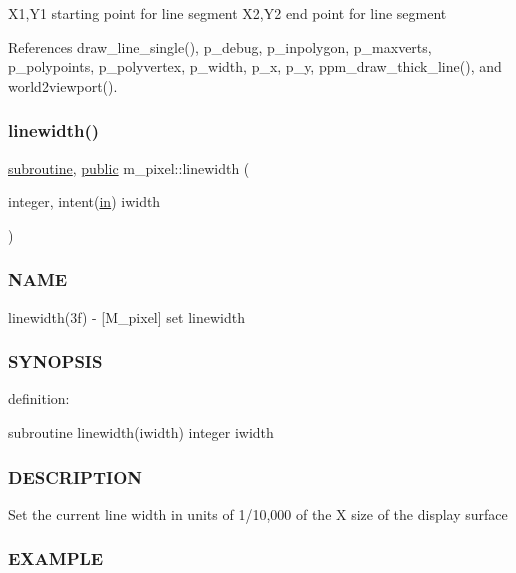 X1,Y1 starting point for line segment X2,Y2 end point for line segment 

References draw\+\_\+line\+\_\+single(), p\+\_\+debug, p\+\_\+inpolygon, p\+\_\+maxverts, p\+\_\+polypoints, p\+\_\+polyvertex, p\+\_\+width, p\+\_\+x, p\+\_\+y, ppm\+\_\+draw\+\_\+thick\+\_\+line(), and world2viewport().

\mbox{\label{namespacem__pixel_a16379e283aaa99e2e0ba1eb26e93452d}} 
\subsubsection{\texorpdfstring{linewidth()}{linewidth()}}
{\footnotesize\ttfamily \hyperlink{M__stopwatch_83_8txt_acfbcff50169d691ff02d4a123ed70482}{subroutine}, \hyperlink{M__stopwatch_83_8txt_a2f74811300c361e53b430611a7d1769f}{public} m\+\_\+pixel\+::linewidth (\begin{DoxyParamCaption}\item[{integer, intent(\hyperlink{M__journal_83_8txt_afce72651d1eed785a2132bee863b2f38}{in})}]{iwidth }\end{DoxyParamCaption})}



\subsubsection*{N\+A\+ME}

linewidth(3f) -\/ \mbox{[}M\+\_\+pixel\mbox{]} set linewidth 

\subsubsection*{S\+Y\+N\+O\+P\+S\+IS}

definition\+:

subroutine linewidth(iwidth) integer iwidth

\subsubsection*{D\+E\+S\+C\+R\+I\+P\+T\+I\+ON}

Set the current line width in units of 1/10,000 of the X size of the display surface \subsubsection*{E\+X\+A\+M\+P\+LE}

